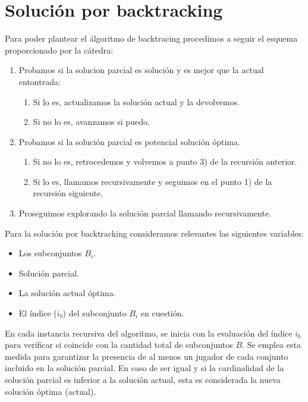 \section{Solución por backtracking}

Para poder plantear el álgoritmo de backtracing procedimos a seguir el esquema proporcionado por la cátedra:
\begin{enumerate}
    \item Probamos si la solucion parcial es solución y es mejor que la actual entontrada:
    \begin {enumerate}
        \item Si lo es, actualizamos la solución actual y la devolvemos.
        \item Si no lo es, avanzamos si puedo.
    \end{enumerate}
    \item Probamos si la solución parcial es potencial solución óptima.
    \begin {enumerate}
        \item Si no lo es, retrocedemos y volvemos a punto 3) de la recursión anterior.
        \item Si lo es, llamamos recursivamente y seguimos en el punto 1) de la recursión siguiente.
    \end{enumerate}
    \item Proseguimos explorando la solución parcial llamando recursivamente.
\end{enumerate}

Para la solución por backtracking consideramos relevantes las siguientes variables:
\begin{itemize}
    \item Los subconjuntos $B_i$.
    \item Solución parcial.
    \item La solución actual óptima.
    \item El índice ($i_b$) del subconjunto $B_i$ en cuestión. 
\end{itemize}

En cada instancia recursiva del algoritmo, se inicia con la evaluación del índice $i_b$ para verificar si coincide con la cantidad total de subconjuntos $B$. 
Se emplea esta medida para garantizar la presencia de al menos un jugador de cada conjunto incluido en la solución parcial.
En caso de ser igual y si la cardinalidad de la solución parcial es inferior a la solución actual, esta es considerada la nueva solución óptima (actual).

